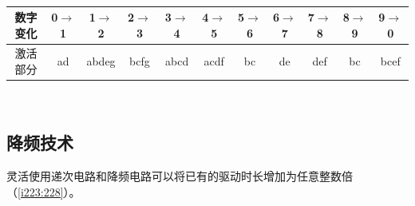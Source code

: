 \begin{table}[!ht]
\centering
\begin{tabular}{c|c|c|c|c|c|c|c|c|c|c}
数字变化&0$\to$1&1$\to$2&2$\to$3&3$\to$4&4$\to$5&5$\to$6&6$\to$7&7$\to$8&8$\to$9&9$\to$0\\
\hline
激活部分&ad&abdeg&bcfg&abcd&acdf&bc&de&def&bc&bcef
\end{tabular}
\caption{}
\label{jishuqi}
\end{table}

\begin{figure}[!ht]
\begin{center}
\\
\end{center}
\caption{}
\label{i113:114}
\end{figure}

\subsection{降频技术}\label{sec18}
灵活使用递次电路和降频电路可以将已有的驱动时长增加为任意整数倍（\autoref{i223:228}）。

